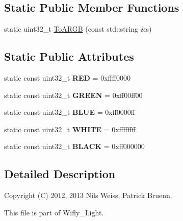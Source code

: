 \subsection*{Static Public Member Functions}
\begin{DoxyCompactItemize}
\item 
static uint32\-\_\-t \hyperlink{class_wifly_color_a0e552c6a422e953415700714ab9db184}{To\-A\-R\-G\-B} (const std\-::string \&s)
\end{DoxyCompactItemize}
\subsection*{Static Public Attributes}
\begin{DoxyCompactItemize}
\item 
\hypertarget{class_wifly_color_a9a00937bdf95435aa6e3e41ba5c6708b}{static const uint32\-\_\-t {\bfseries R\-E\-D} = 0xffff0000}\label{class_wifly_color_a9a00937bdf95435aa6e3e41ba5c6708b}

\item 
\hypertarget{class_wifly_color_adb9acf98ee5417f6293ae3fa9277237d}{static const uint32\-\_\-t {\bfseries G\-R\-E\-E\-N} = 0xff00ff00}\label{class_wifly_color_adb9acf98ee5417f6293ae3fa9277237d}

\item 
\hypertarget{class_wifly_color_ad63591638c12c2f9c5df743fceef6c43}{static const uint32\-\_\-t {\bfseries B\-L\-U\-E} = 0xff0000ff}\label{class_wifly_color_ad63591638c12c2f9c5df743fceef6c43}

\item 
\hypertarget{class_wifly_color_a746808c029beaa107b15296826f7e462}{static const uint32\-\_\-t {\bfseries W\-H\-I\-T\-E} = 0xffffffff}\label{class_wifly_color_a746808c029beaa107b15296826f7e462}

\item 
\hypertarget{class_wifly_color_afa045408a6b3f401e8b7d850f120a025}{static const uint32\-\_\-t {\bfseries B\-L\-A\-C\-K} = 0xff000000}\label{class_wifly_color_afa045408a6b3f401e8b7d850f120a025}

\end{DoxyCompactItemize}


\subsection{Detailed Description}
Copyright (C) 2012, 2013 Nils Weiss, Patrick Bruenn.

This file is part of Wifly\-\_\-\-Light.

